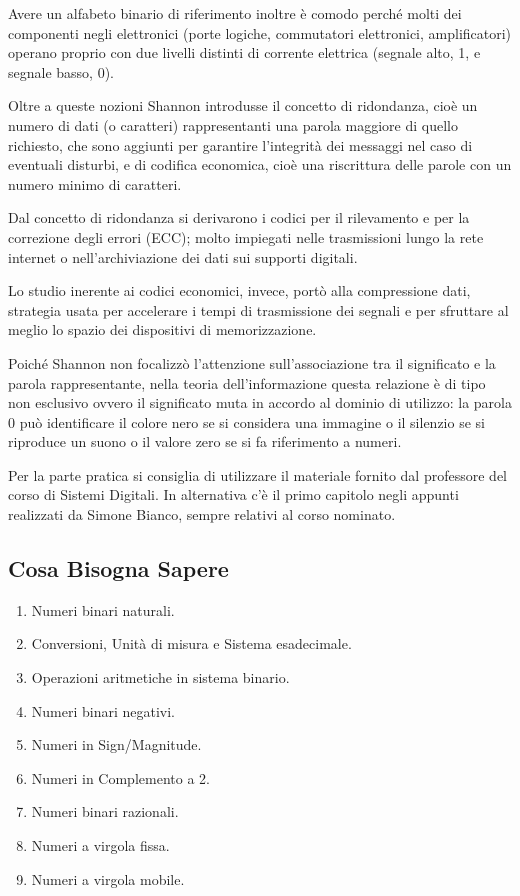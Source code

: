 \documentclass[12pt]{article} %
\begin{document}
Avere un alfabeto binario di riferimento inoltre è comodo perché molti dei componenti negli elettronici (porte logiche, commutatori elettronici, amplificatori) operano proprio con due livelli distinti di corrente elettrica (segnale alto, 1, e segnale basso, 0).\par\medskip\noindent
Oltre a queste nozioni Shannon introdusse il concetto di ridondanza, cioè un numero di dati (o caratteri) rappresentanti una parola maggiore di quello richiesto, che sono aggiunti per garantire l’integrità dei messaggi nel caso di eventuali disturbi, e di codifica economica, cioè una riscrittura delle parole con un numero minimo di caratteri. \par\medskip\noindent
Dal concetto di ridondanza si derivarono i codici per il rilevamento e per la correzione degli errori (ECC); molto impiegati nelle trasmissioni lungo la rete internet o nell’archiviazione dei dati sui supporti digitali. \par\medskip\noindent
Lo studio inerente ai codici economici, invece, portò alla compressione dati, strategia usata per accelerare i tempi di trasmissione dei segnali e per sfruttare al meglio lo spazio dei dispositivi di memorizzazione.\par\medskip\noindent
Poiché Shannon non focalizzò l’attenzione sull’associazione tra il significato e la parola rappresentante, nella teoria dell’informazione questa relazione è di tipo non esclusivo ovvero il significato muta in accordo al dominio di utilizzo: la parola 0 può identificare il colore nero se si considera una immagine o il silenzio se si riproduce un suono o il valore zero se si fa riferimento a numeri.\par\medskip\noindent
Per la parte pratica si consiglia di utilizzare il materiale fornito dal professore del corso di Sistemi Digitali. In alternativa c’è il primo capitolo negli appunti realizzati da Simone Bianco, sempre relativi al corso nominato.
\subsection{Cosa Bisogna Sapere}
\begin{enumerate}
    \item Numeri binari naturali.
    \item Conversioni, Unità di misura e Sistema esadecimale.
    \item Operazioni aritmetiche in sistema binario.
    \item Numeri binari negativi.
    \item Numeri in Sign/Magnitude.
    \item Numeri in Complemento a 2.
    \item Numeri binari razionali.
    \item Numeri a virgola fissa.
    \item Numeri a virgola mobile.
\end{enumerate}
\end{document}

